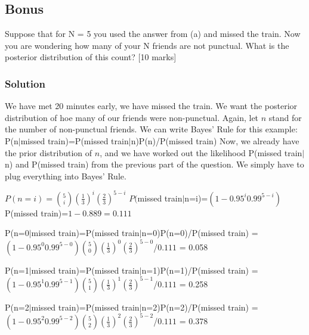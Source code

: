 \documentclass{article}
\begin{document}
\subsection{Bonus}
Suppose that for N = 5 you used the answer from (a) and missed the train. Now you are wondering how many of your N friends are not punctual. What is the posterior distribution of this count? [10
marks]

\subsubsection{Solution}
We have met 20 minutes early, we have missed the train. We want the posterior distribution of hoe many of our friends were non-punctual. Again, let $n$ stand for the number of non-punctual friends. We can write Bayes' Rule for this example:
\newline
\noindent
P(n$|$missed train)=P(missed train$|$n)P(n)/P(missed train)
\newline
\noindent
Now, we already have the prior distribution of $n$, and we have worked out the likelihood P(missed train$|$n) and P(missed train) from the previous part of the question. We simply have to plug everything into Bayes' Rule. 
\newline

\noindent
$P(n=i)={5 \choose i}(\frac{1}{3})^i (\frac{2}{3})^{5-i}$
\newline
\noindent
$P($missed train$|$n=i)=$(1-0.95^{i}0.99^{5-i})$
\newline
\noindent
P(missed train)=$1-0.889=0.111$
\newline

\noindent
P(n=0$|$missed train)=P(missed train$|$n=0)P(n=0)/P(missed train)
\newline
\noindent
= $(1-0.95^{0}0.99^{5-0}){5 \choose 0}(\frac{1}{3})^0 (\frac{2}{3})^{5-0}$/$0.111$
\newline 
\noindent
= 0.058
\newline

\noindent
P(n=1$|$missed train)=P(missed train$|$n=1)P(n=1)/P(missed train)
\newline
\noindent
= $(1-0.95^{1}0.99^{5-1}){5 \choose 1}(\frac{1}{3})^1 (\frac{2}{3})^{5-1}$/$0.111$
\newline 
\noindent
= 0.258
\newline

\noindent
P(n=2$|$missed train)=P(missed train$|$n=2)P(n=2)/P(missed train)
\newline
\noindent
= $(1-0.95^{2}0.99^{5-2}){5 \choose 2}(\frac{1}{3})^2 (\frac{2}{3})^{5-2}$/$0.111$
\newline 
\noindent
= 0.378
\newline
\end{document}
